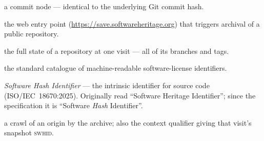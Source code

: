 \begin{description}[leftmargin=!,labelwidth=3.1cm,font=\bfseries,style=nextline]
  \item[Revision (\texttt{rev})] a commit node --- identical to the underlying Git commit hash.
  \item[Save Code Now] the web entry point (\url{https://save.softwareheritage.org}) that triggers
        archival of a public repository.
  \item[Snapshot (\texttt{snp})] the full state of a repository at one visit --- all of its branches
        and tags.
  \item[SPDX] the standard catalogue of machine-readable software-license identifiers.
  \item[SWHID] \emph{Software Hash Identifier} --- the intrinsic identifier for source code
        (ISO/IEC~18670:2025). Originally read \enquote{Software Heritage Identifier}; since the
        specification it is \enquote{Software \emph{Hash} Identifier}.
  \item[Visit] a crawl of an origin by the archive; also the context qualifier giving that visit's
        snapshot \textsc{swhid}.
\end{description}

